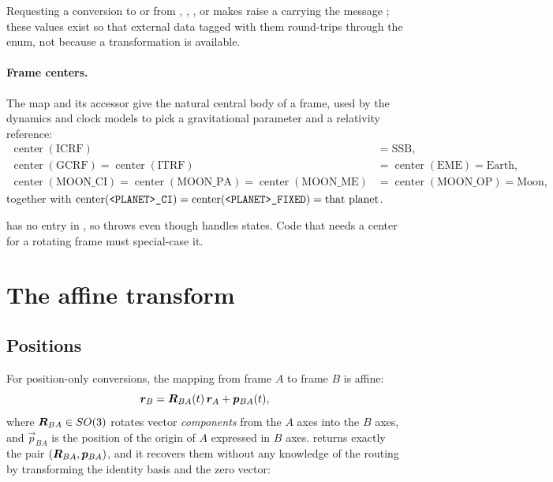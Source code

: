Requesting a conversion to or from , , ,
 or  makes  raise a
 carrying the message ;
these values exist so that external data tagged with them round-trips
through the enum, not because a transformation is available.

\paragraph{Frame centers.} The map  and its accessor
 give the natural central body of a frame, used by the
dynamics and clock models to pick a gravitational parameter and a
relativity reference:
%
\begin{align}
  \label{eq:fc-centers}
  \operatorname{center}(\mathrm{ICRF}) &= \mathrm{SSB}, \nonumber\\
  \operatorname{center}(\mathrm{GCRF})
    = \operatorname{center}(\mathrm{ITRF})
    &= \operatorname{center}(\mathrm{EME}) = \mathrm{Earth}, \\
  \operatorname{center}(\mathrm{MOON\_CI})
    = \operatorname{center}(\mathrm{MOON\_PA})
    = \operatorname{center}(\mathrm{MOON\_ME})
    &= \operatorname{center}(\mathrm{MOON\_OP}) = \mathrm{Moon},
    \nonumber
\end{align}
%
together with $\operatorname{center}(\texttt{<PLANET>\_CI}) =
\operatorname{center}(\texttt{<PLANET>\_FIXED}) = \text{that planet}$.

\begin{lupntnote}
   has no entry in , so
   throws even though
   handles  states. Code that needs a center for
  a rotating frame must special-case it.
\end{lupntnote}

\section{The affine transform}
\label{sec:fc-affine}

\subsection{Positions}

For position-only conversions, the mapping from frame $A$ to frame $B$ is
affine:
%
\begin{equation}
  \label{eq:fc-affine}
  \bm{r}_B = \bm{R}_{BA}(t)\,\bm{r}_A + \bm{p}_{BA}(t),
\end{equation}
%
where $\bm{R}_{BA} \in SO(3)$ rotates vector \emph{components} from the $A$
axes into the $B$ axes, and $\vec{p}_{BA}$ is the position of the origin of
$A$ expressed in $B$ axes.  returns exactly
the pair $(\bm{R}_{BA}, \bm{p}_{BA})$, and it recovers them without any
knowledge of the routing by transforming the identity basis and the zero
vector:

